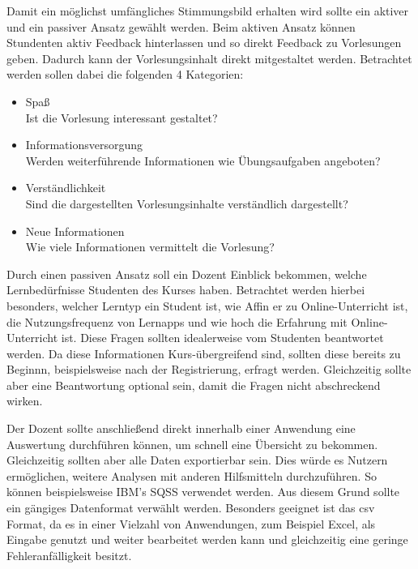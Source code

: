 Damit ein möglichst umfängliches Stimmungsbild erhalten wird sollte ein aktiver und ein passiver Ansatz gewählt werden.
Beim aktiven Ansatz können Stundenten aktiv Feedback hinterlassen und so direkt Feedback zu Vorlesungen geben. Dadurch kann der Vorlesungsinhalt direkt mitgestaltet werden. Betrachtet werden sollen dabei die folgenden 4 Kategorien:
\begin{itemize}
    \item Spaß\\
        Ist die Vorlesung interessant gestaltet?
    \item Informationsversorgung\\
        Werden weiterführende Informationen wie Übungsaufgaben angeboten?
    \item Verständlichkeit\\
        Sind die dargestellten Vorlesungsinhalte verständlich dargestellt?
    \item Neue Informationen\\
        Wie viele Informationen vermittelt die Vorlesung?
\end{itemize}


Durch einen passiven Ansatz soll ein Dozent Einblick bekommen, welche Lernbedürfnisse Studenten des Kurses haben.
Betrachtet werden hierbei besonders, welcher Lerntyp ein Student ist, wie Affin er zu Online-Unterricht ist, die Nutzungsfrequenz von Lernapps und wie hoch die Erfahrung mit Online-Unterricht ist.
Diese Fragen sollten idealerweise vom Studenten beantwortet werden. Da diese Informationen Kurs-übergreifend sind, sollten diese bereits zu Beginnn, beispielsweise nach der Registrierung, erfragt werden.
Gleichzeitig sollte aber eine Beantwortung optional sein, damit die Fragen nicht abschreckend wirken.

Der Dozent sollte anschließend direkt innerhalb einer Anwendung eine Auswertung durchführen können, um schnell eine Übersicht zu bekommen. Gleichzeitig sollten aber alle Daten exportierbar sein. Dies würde es Nutzern ermöglichen, weitere Analysen mit anderen Hilfsmitteln durchzuführen. So können beispielsweise IBM's SQSS verwendet werden.
Aus diesem Grund sollte ein gängiges Datenformat verwählt werden. 
Besonders geeignet ist das csv Format, da es in einer Vielzahl von Anwendungen, zum Beispiel Excel, als Eingabe genutzt und weiter bearbeitet werden kann und gleichzeitig eine geringe Fehleranfälligkeit besitzt.




























